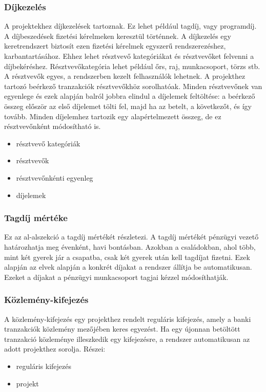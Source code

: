 \documentclass[a4paper,12pt]{article}
\begin{document}
\subsubsection{Díjkezelés}
A projektekhez díjkezelések tartoznak. Ez lehet például tagdíj, vagy programdíj. A díjbeszedések fizetési kérelmeken keresztül történnek. A díjkezelés egy keretrendszert biztosít ezen fizetési kérelmek egyszerű rendszerezéshez, karbantartásához. Ehhez lehet résztvevő kategóriákat és résztvevőket felvenni a díjbekéréshez. Résztvevőkategória lehet például őrs, raj, munkacsoport, törzs stb. A résztvevők egyes, a rendszerben kezelt felhasználók lehetnek. A projekthez tartozó beérkező tranzakciók résztvevőkhöz sorolhatóak. Minden résztvevőnek van egyenlege és ezek alapján balról jobbra elindul a díjelemek feltöltése: a beérkező összeg először az első díjelemet tölti fel, majd ha az betelt, a következőt, és így tovább. Minden díjelemhez tartozik egy alapértelmezett összeg, de ez résztvevőnként módosítható is.
\begin{itemize}
  \item résztvevő kategóriák
  \item résztvevők
  \item résztvevőnkénti egyenleg
  \item díjelemek
\end{itemize}
\subsubsection{Tagdíj mértéke}
Ez az al-alszekció a tagdíj mértékét részletezi. A tagdíj mértékét pénzügyi vezető határozhatja meg évenként, havi bontásban. Azokban a családokban, ahol több, mint két gyerek jár a csapatba, csak két gyerek után kell tagdíjat fizetni. Ezek alapján az elvek alapján a konkrét díjakat a rendszer állítja be automatikusan. Ezeket a díjakat a pénzügyi munkacsoport tagjai kézzel módosíthatják.
\subsubsection{Közlemény-kifejezés}
A közlemény-kifejezés egy projekthez rendelt reguláris kifejezés, amely a banki tranzakciók közlemény mezőjében keres egyezést. Ha egy újonnan betöltött tranzakció közleménye illeszkedik egy kifejezésre, a rendszer automatikusan az adott projekthez sorolja. Részei:
\begin{itemize}
  \item reguláris kifejezés
  \item projekt
\end{itemize}
\end{document}
